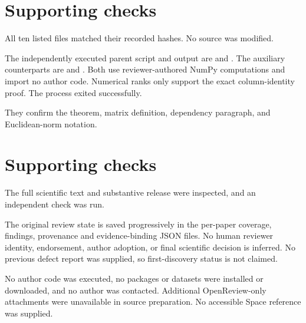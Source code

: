 \documentclass[10pt]{article}
\begin{document}
\section*{Supporting checks}
All ten listed files matched their recorded hashes. No source was modified.\par
The independently executed parent script and output are and . The auxiliary counterparts are and . Both use reviewer-authored NumPy computations and import no author code. Numerical ranks only support the exact column-identity proof. The process exited successfully.\par
They confirm the theorem, matrix definition, dependency paragraph, and Euclidean-norm notation.\par
\section*{Supporting checks}
The full scientific text and substantive release were inspected, and an independent check was run.\par
The original review state is saved progressively in the per-paper coverage, findings, provenance and evidence-binding JSON files. No human reviewer identity, endorsement, author adoption, or final scientific decision is inferred. No previous defect report was supplied, so first-discovery status is not claimed.\par
No author code was executed, no packages or datasets were installed or downloaded, and no author was contacted. Additional OpenReview-only attachments were unavailable in source preparation. No accessible Space reference was supplied.\par
\end{document}
